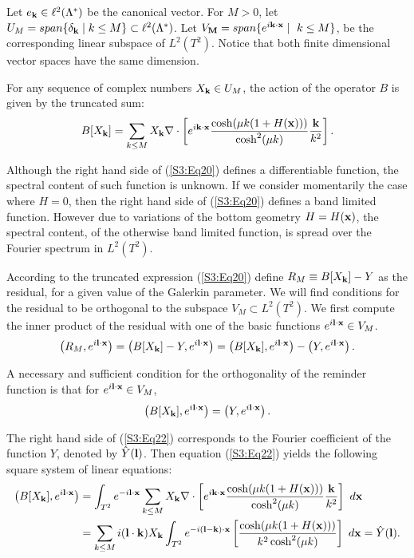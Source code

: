 Let $e_{\bold{k}}\in\ell^2(\Lambda^*)$ be the canonical vector. For $M>0$, let $U_M = span\{\delta_{\bold{k}} \mid k\leq M\}\subset \ell^2(\Lambda^*)$.  Let $V_{\bold{M}} = span\{e^{i\bold{k}\cdot\bold{x}} \mid \ k\leq M\}$, be the corresponding linear subspace of $L^2(T^2)$. Notice that both finite dimensional vector spaces have the same dimension.

For any sequence of complex numbers $X_{\bold{k}}\in U_M$, the action of the operator $B$ is given by the truncated sum:
\begin{equation}\label{S3:Eq20}
B[X_{\bold{k}}] = \sum_{k\leq M}X_{\bold{k}}\nabla\cdot \left[ e^{i\bold{k}\cdot\bold{x}} \frac{\cosh(\mu k(1+H(\bold{x})))}{\cosh^2(\mu k)}\frac{\bold{k}}{k^2}\right].
\end{equation}

Although the right hand side of (\ref{S3:Eq20}) defines a differentiable function, the spectral content of such function is unknown. 
If we consider momentarily the case where $H = 0$, then the right hand side of (\ref{S3:Eq20}) defines a band limited function. However due to variations of the bottom geometry $H=H(\bold{x})$, the spectral content, of the otherwise band limited function, is spread over the Fourier spectrum in $L^2(T^2)$. 

According to the truncated expression  (\ref{S3:Eq20}) define $R_M \equiv B[X_{\bold{k}}] - Y$ as the residual, for a 
given value of the Galerkin parameter. We will find conditions for the residual to be orthogonal to the subspace $V_M\subset L^2(T^2)$.
We first compute the inner product of the residual  with one of the basic functions $e^{i\bold{l}\cdot\bold{x}}\in V_M$.
\begin{equation}\label{S3:Eq21}
\left(R_M,e^{i\bold{l}\cdot\bold{x}}\right) = \left(B[X_{\bold{k}}] - Y,e^{i\bold{l}\cdot\bold{x}}\right) = \left(B[X_{\bold{k}}],e^{i\bold{l}\cdot\bold{x}}\right) -\left(Y,e^{i\bold{l}\cdot\bold{x}}\right).
\end{equation}

A necessary and sufficient condition for the orthogonality of the reminder function is that for $e^{i\bold{l}\cdot\bold{x}}\in V_M$, 
\begin{equation}\label{S3:Eq22}
\left(B[X_{\bold{k}}],e^{i\bold{l}\cdot\bold{x}}\right) = \left(Y,e^{i\bold{l}\cdot\bold{x}}\right).
\end{equation}

The right hand side of (\ref{S3:Eq22}) corresponds to the Fourier coefficient of the function $Y$, denoted by $\hat{Y}(\bold{l})$. Then equation (\ref{S3:Eq22}) yields the following square system of linear equations:
\begin{equation}\label{S3:Eq23}
\begin{aligned}
\left(B[X_{\bold{k}}],e^{i\bold{l}\cdot\bold{x}}\right) &= \int_{T^2}e^{-i\bold{l}\cdot\bold{x}}\sum_{k\leq M}X_{\bold{k}}\nabla\cdot \left[ e^{i\bold{k}\cdot\bold{x}} \frac{\cosh(\mu k(1+H(\bold{x})))}{\cosh^2(\mu k)}\frac{\bold{k}}{k^2}\right]\ d\bold{x}\\ 
&= \sum_{k\leq M} i(\bold{l}\cdot\bold{k}) X_{\bold{k}}\int_{T^2} e^{-i(\bold{l}-\bold{k})\cdot\bold{x}}\left[\frac{\cosh(\mu k(1+H(\bold{x})))}{k^2\cosh^2(\mu k)}\right]\ d\bold{x} = \hat{Y}(\bold{l}).
\end{aligned}
\end{equation}

